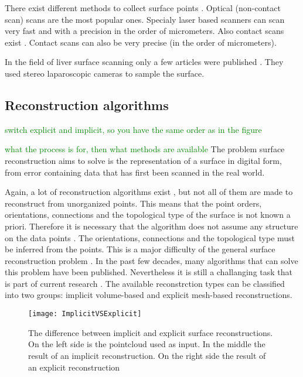 There exist different methods to collect surface points
\cite{franca20053d}\cite{levoy2000digital}\cite{cui20113d}\cite{chu2002infrared}\cite{dou20153d}.
Optical (non-contact scan) scans are the most popular ones. Specialy laser based
scanners can scan very fast and with a precision in the order of micrometers. Also contact scans exist
\cite{pai2001scanning}. Contact scans can also be very precise (in the order of
micrometers).

In the field of liver surface scanning only a few articles were published  \cite{maier2014comparative} \cite{thompson2015accuracy}. 
They used stereo laparoscopic cameras to sample the surface.
\subsection{Reconstruction algorithms}
\textcolor{green}{ switch explicit and implicit, so you have the same order as in the figure}

\textcolor{green}{what the process is for, then what methods are available}
The problem
surface reconstruction aims to solve is the representation of a surface in 
digital form, from error containing data that has first been scanned in the
real world.

Again, a lot of reconstruction algorithms exist \cite{lim2014surface}, but not
all of them are made to reconstruct from unorganized points. This means
that the point orders, orientations, connections and the topological type of the
surface is not known a priori. Therefore it is necessary that the algorithm does not assume any structure
on the data points \cite{hornung2006robust} \cite{yu1999surface}. The orientations, connections and the topological
type must be inferred from the points. This is a major difficulty of the general surface
reconstruction problem \cite{hoppe1992surface}. In the past few decades, many
algorithms that can solve this problem have been published. Nevertheless it is
still a challanging task that is part of current research \cite{li2018surface}.
The available reconstrction types can be classified into two groups: implicit
volume-based and explicit mesh-based reconstructions.
\begin{figure}[H]
  \centering
 \texttt{[image: ImplicitVSExplicit]}
 \caption{The difference between implicit and explicit surface reconstructions.
   On the left side is the pointcloud used as input. In the middle the result of an
   implicit reconstruction. On the right side the result of an explicit
   reconstruction \cite{stanfordPP}}
  \label{fig:ImplicitVSExplicit}
\end{figure}
